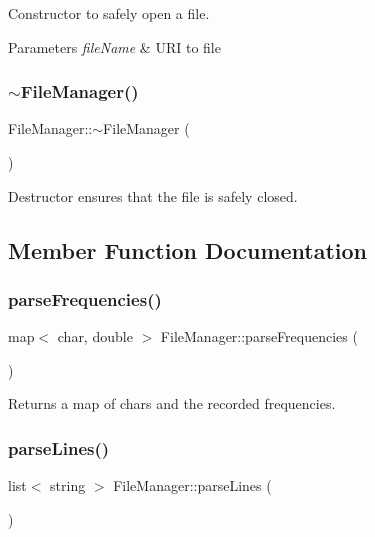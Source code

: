 Constructor to safely open a file.


\begin{DoxyParams}{Parameters}
{\em file\+Name} & U\+RI to file \\
\hline
\end{DoxyParams}
\mbox{\label{classFileManager_abaed33b5b0c13b8a597db9335a1aacfa}} 
\subsubsection{\texorpdfstring{$\sim$\+File\+Manager()}{~FileManager()}}
{\footnotesize\ttfamily File\+Manager\+::$\sim$\+File\+Manager (\begin{DoxyParamCaption}{ }\end{DoxyParamCaption})}

Destructor ensures that the file is safely closed. 

\subsection{Member Function Documentation}
\mbox{\label{classFileManager_afb8f7a73be3a7392fc822253aa554531}} 
\subsubsection{\texorpdfstring{parse\+Frequencies()}{parseFrequencies()}}
{\footnotesize\ttfamily map$<$ char, double $>$ File\+Manager\+::parse\+Frequencies (\begin{DoxyParamCaption}{ }\end{DoxyParamCaption})}

\begin{DoxyReturn}{Returns}
a map of chars and the recorded frequencies. 
\end{DoxyReturn}
\mbox{\label{classFileManager_abd1d0f98cb32a54435e491f876f73d14}} 
\subsubsection{\texorpdfstring{parse\+Lines()}{parseLines()}}
{\footnotesize\ttfamily list$<$ string $>$ File\+Manager\+::parse\+Lines (\begin{DoxyParamCaption}{ }\end{DoxyParamCaption})}

